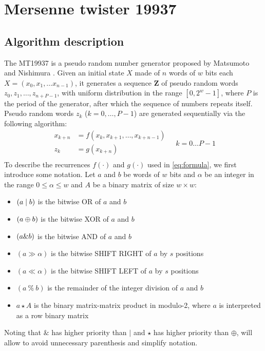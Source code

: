 \documentclass[preprint,1p,times]{elsarticle}
\begin{document}
	\section{Mersenne twister 19937}
	\label{sec:mt19937}
	\subsection{Algorithm description}
	The MT19937 is a pseudo random number generator proposed by Matsumoto and Nishimura \cite{mt19937}.
	Given an initial state $X$ made of $n$ words of $w$ bits each $X=(x_0, x_1, \dots x_{n-1})$, it generates a sequence $\boldsymbol{Z}$ of pseudo random words $z_{0}, z_{1}, \dots, z_{n+P-1}$, with uniform distribution in the range $[0, 2^w-1]$, where $P$ is the period of the generator, after which the sequence of numbers repeats itself. \\
	
	Pseudo random words $z_k$ ($k=0, \dots, P-1$) are generated sequentially via the following algorithm:
	\begin{equation}
		\label{eq:formula}
		\begin{aligned}
			x_{k+n} &= f(x_{k}, x_{k+1},\dots, x_{k+n-1}) \\
			z_k &= g(x_{k+n}) \\
		\end{aligned}
		\quad k=0\dots P-1
	\end{equation}
	To describe the recurrences $f(\cdot)$ and $g(\cdot)$ used in \eqref{eq:formula}, we first introduce some notation. Let $a$ and $b$ be words of $w$ bits and $\alpha$ be an integer in the range $0\le \alpha \le w$ and $A$ be a binary matrix of size $w \times w$:
	\begin{itemize}
		\item $(a \mid b)$ is the bitwise OR of $a$ and $b$
		\item $(a \mathbin{\oplus} b)$ is the bitwise XOR of $a$ and $b$
		\item $(a \& b)$ is the bitwise AND of $a$ and $b$
		\item $(a \gg \alpha)$ is the bitwise SHIFT RIGHT of $a$ by $s$ positions
		\item $(a \ll \alpha)$ is the bitwise SHIFT LEFT of $a$ by $s$ positions
		\item $(a~\%~b)$ is the remainder of the integer division of $a$ and $b$
		\item $a \star A$ is the binary matrix-matrix product in modulo-2, where $a$ is interpreted as a row binary matrix
	\end{itemize}
	Noting that $\&$ has higher priority than $\mid$ and $\star$ has higher priority than $\oplus$, will allow to avoid unnecessary parenthesis and simplify notation.
	
\end{document}
